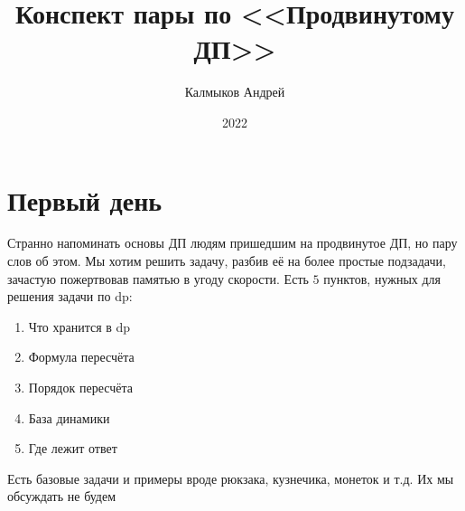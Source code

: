 \documentclass[a4paper, 12pt]{article}
\title{Конспект пары по <<Продвинутому ДП>>}
\author{Калмыков Андрей}
\date{2022}
\theoremstyle{plain}
\theoremstyle{definition}
\theoremstyle{remark}
\begin{document}
	\clearpage\maketitle
	\thispagestyle{empty}
	\newpage
	\tableofcontents
	\newpage
	\section{Первый день}
		Странно напоминать основы ДП людям пришедшим на продвинутое ДП, но пару слов об этом. Мы хотим решить задачу, разбив её на более простые подзадачи, зачастую пожертвовав памятью в угоду скорости. Есть $5$ пунктов, нужных для решения задачи по dp:
	\begin{enumerate}
		\item Что хранится в dp
	\item Формула пересчёта
	\item Порядок пересчёта
	\item База динамики
	\item Где лежит ответ
\end{enumerate}
	Есть базовые задачи и примеры вроде рюкзака, кузнечика, монеток и т.д. Их мы обсуждать не будем\\
\end{document}
